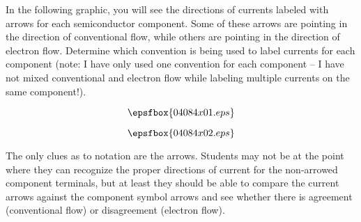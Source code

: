 

In the following graphic, you will see the directions of currents labeled with arrows for each semiconductor component.  Some of these arrows are pointing in the direction of conventional flow, while others are pointing in the direction of electron flow.  Determine which convention is being used to label currents for each component (note: I have only used one convention for each component -- I have not mixed conventional and electron flow while labeling multiple currents on the same component!).

$$\epsfbox{04084x01.eps}$$







$$\epsfbox{04084x02.eps}$$







The only clues as to notation are the arrows.  Students may not be at the point where they can recognize the proper directions of current for the non-arrowed component terminals, but at least they should be able to compare the current arrows against the component symbol arrows and see whether there is agreement (conventional flow) or disagreement (electron flow).




